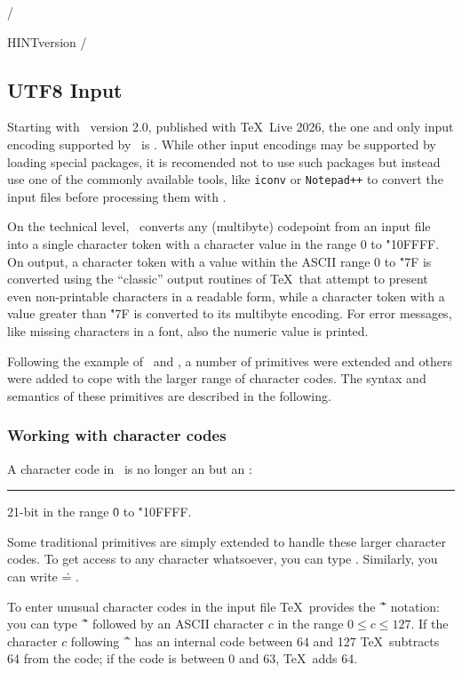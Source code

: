 {\parskip=0pt
\verbatim/
\newif\ifhint
\expandafter
  \ifx\csname HINTversion\endcsname\relax
  \hintfalse\else\hinttrue\fi/
}

\subsection{UTF8 Input}
Starting with \HiTeX\ version 2.0, published with \TeX\ Live 2026,
the one and only input encoding supported by \HiTeX\ is .
While other input encodings may be supported by loading special
packages, it is recomended not to use such packages but instead
use one of the commonly available tools, like {\tt iconv} or {\tt Notepad++}
to convert the input files before processing them with \HiTeX.

On the technical level, \HiTeX\ converts any (multibyte)  codepoint from an input file
into a single character token with a character value in the range 0 to \.{"10FFFF}.
On output, a character token with a value within the ASCII range 0 to  \.{"7F}
is converted using the ``classic'' output routines of \TeX\ that attempt to
present even non-printable characters in a readable form,
while a character token with a value greater than \.{"7F} is converted to
its multibyte  encoding. For error messages, like missing characters in a font,
also the numeric value is printed.

Following the example of \LuaTeX\ and \XeTeX, a number of primitives were
extended and others were added to cope with the larger range of character codes.
The syntax and semantics of these primitives are described in the following.

\subsubsection{Working with character codes}
A character code in \HiTeX\ is no longer 
an  but an :
\medskip
\rule{}: 
21-bit  in the range \.{0} to \.{"10FFFF}. 
\medskip

Some traditional primitives are simply extended to handle these larger
character codes. To get access to any character whatsoever, you can type
. Similarly, you can write
 \.{=} .

To enter unusual character codes in the input file \TeX\ provides the \.{\^\^} notation:
you can type \.{\^\^} followed by an ASCII character $c$ in the range $0\le c\le 127$.
If the character  $c$ following \.{ \^\^} has an internal code between 64 and 127
\TeX\ subtracts 64 from the code; if the code is between 0 and 63, \TeX\ adds 64.

